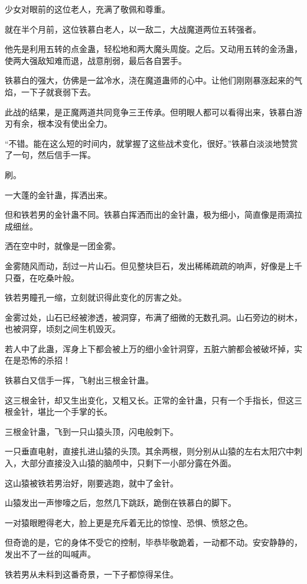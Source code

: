 \begin{this_body}
少女对眼前的这位老人，充满了敬佩和尊重。

就在半个月前，这位铁慕白老人，以一敌二，大战魔道两位五转强者。

他先是利用五转的点金蛊，轻松地和两大魔头周旋。之后。又动用五转的金汤蛊，使两大强敌知难而退，战意削弱，最后各自罢手。

铁慕白的强大，仿佛是一盆冷水，浇在魔道蛊师的心中。让他们刚刚暴涨起来的气焰，一下子就衰弱下去。

此战的结果，是正魔两道共同竞争三王传承。但明眼人都可以看得出来，铁慕白游刃有余，根本没有使出全力。

“不错。能在这么短的时间内，就掌握了这些战术变化，很好。”铁慕白淡淡地赞赏了一句，然后信手一挥。

刷。

一大蓬的金针蛊，挥洒出来。

但和铁若男的金针蛊不同。铁慕白挥洒而出的金针蛊，极为细小，简直像是雨滴拉成细丝。

洒在空中时，就像是一团金雾。

金雾随风而动，刮过一片山石。但见整块巨石，发出稀稀疏疏的响声，好像是上千只蚕，在吃桑叶般。

铁若男瞳孔一缩，立刻就识得此变化的厉害之处。

金雾过处，山石已经被渗透，被洞穿，布满了细微的无数孔洞。山石旁边的树木，也被洞穿，顷刻之间生机毁灭。

若人中了此蛊，浑身上下都会被上万的细小金针洞穿，五脏六腑都会被破坏掉，实在是恐怖的杀招！

铁慕白又信手一挥，飞射出三根金针蛊。

这三根金针，却又生出变化，又粗又长。正常的金针蛊，只有一个手指长，但这三根金针，堪比一个手掌的长。

三根金针蛊，飞到一只山猿头顶，闪电般刺下。

一只垂直电射，直接扎进山猿的头顶。其余两根，则分别从山猿的左右太阳穴中刺入，大部分直接没入山猿的脑颅中，只剩下一小部分露在外面。

这山猿被铁若男治好，刚要逃跑，就中了金针。

山猿发出一声惨嚎之后，忽然几下跳跃，跪倒在铁慕白的脚下。

一对猿眼瞪得老大，脸上更是充斥着无比的惊惶、恐惧、愤怒之色。

但奇诡的是，它的身体不受它的控制，毕恭毕敬跪着，一动都不动。安安静静的，发出不了一丝的叫喊声。

铁若男从未料到这番奇景，一下子都惊得呆住。


\end{this_body}
